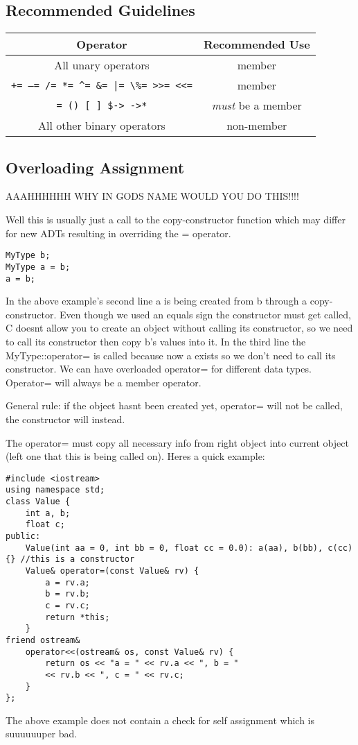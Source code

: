 \documentclass[12pt]{article}
\begin{document}
\subsection*{Recommended Guidelines}
\begin{table}[h]
\begin{center}
\begin{tabular}{c | c}
\hline
\textbf{Operator} & \textbf{Recommended Use}\\ \hline
All unary operators & member\\ \hline
\verb!+= –= /= *= ^= &= |= \%= >>= <<=! & member\\ \hline
\verb!= () [ ] $-> ->*! & \textit{must} be a member \\ \hline
All other binary operators & non-member\\ \hline
\end{tabular}
\end{center}
\end{table}

\subsection*{Overloading Assignment}
AAAHHHHHH WHY IN GODS NAME WOULD YOU DO THIS!!!!

Well this is usually just a call to the copy-constructor function which may differ for new ADTs resulting in overriding the = operator.

\begin{lstlisting}
MyType b;
MyType a = b;
a = b;
\end{lstlisting}
In the above example's second line a is being created from b through a copy-constructor. Even though we used an equals sign the constructor must get called, C doesnt allow you to create an object without calling its constructor, so we need to call its constructor then copy b's values into it. In the third line the MyType::operator= is called because now a exists so we don't need to call its constructor. We can have overloaded operator= for different data types. Operator= will always be a member operator.

General rule: if the object hasnt been created yet, operator= will not be called, the constructor will instead.

The operator= must copy all necessary info from right object into current object (left one that this is being called on). Heres a quick example:
\begin{lstlisting}
#include <iostream>
using namespace std;
class Value {
    int a, b;
    float c;
public:
    Value(int aa = 0, int bb = 0, float cc = 0.0): a(aa), b(bb), c(cc) {} //this is a constructor
    Value& operator=(const Value& rv) {
        a = rv.a;
        b = rv.b;
        c = rv.c;
        return *this;
    }
friend ostream&
    operator<<(ostream& os, const Value& rv) {
        return os << "a = " << rv.a << ", b = "
        << rv.b << ", c = " << rv.c;
    }
};
\end{lstlisting}
The above example does not contain a check for self assignment which is suuuuuuper bad.
\end{document}
